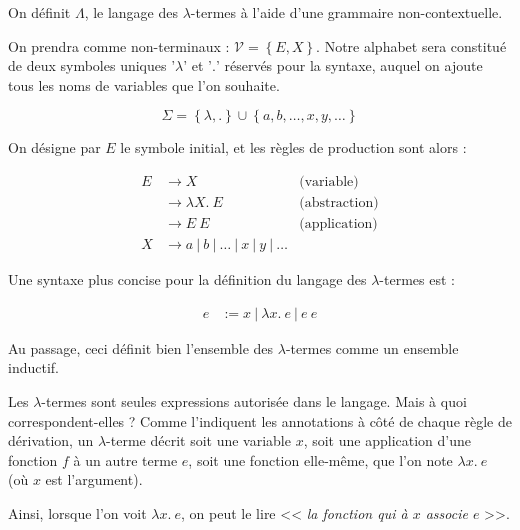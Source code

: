 \documentclass[11pt]{article}
\begin{document}
\begin{definition}
    On définit $\Lambda$, le langage des $\lambda$-termes à l'aide d'une grammaire non-contextuelle. 

    On prendra comme non-terminaux : $\mathcal{V}=\left\{E, X\right\}$. Notre alphabet sera constitué de deux symboles uniques '$\lambda$' et '$.$' réservés pour la syntaxe, auquel on ajoute tous les noms de variables que l'on souhaite.

    $$\Sigma = \left\{\lambda, .\right\}\cup\left\{a, b, \dots, x, y, \dots\right\}$$

    On désigne par $E$ le symbole initial, et les règles de production sont alors :

    \begin{equation*}
    \begin{aligned}
        E &\rightarrow X &\text{(variable)}\\
          &\rightarrow \lambda X.~ E &\text{(abstraction)}\\
          &\rightarrow E~E&\text{(application)}\\
        X &\rightarrow a~|~b~|~\dots~|~x~|~y~|~\dots
    \end{aligned}
    \end{equation*}
\end{definition}

\begin{remark}
    Une syntaxe plus concise pour la définition du langage des $\lambda$-termes est :

    \begin{equation*}
    \begin{aligned}
        e &:= x ~|~\lambda x.~e~|~e~e
    \end{aligned}
    \end{equation*}

    Au passage, ceci définit bien l'ensemble des $\lambda$-termes comme un ensemble inductif.
\end{remark}

Les $\lambda$-termes sont seules expressions autorisée dans le langage. Mais à quoi correspondent-elles ? Comme l'indiquent les annotations à côté de chaque règle de dérivation, un $\lambda$-terme décrit soit une variable $x$, soit une application d'une fonction $f$ à un autre terme $e$, soit une fonction elle-même, que l'on note $\lambda x.~e$ (où $x$ est l'argument).

Ainsi, lorsque l'on voit $\lambda x.~e$, on peut le lire << \textit{la fonction qui à $x$ associe $e$} >>.
\end{document}
